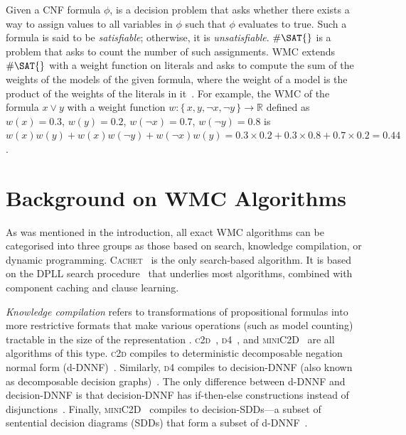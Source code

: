 \documentclass[letterpaper]{article} %
\theoremstyle{definition}
\theoremstyle{remark}
\begin{document}
Given a CNF formula $\phi$, \SAT{} is a decision problem that asks whether there
exists a way to assign values to all variables in $\phi$ such that $\phi$
evaluates to true. Such a formula is said to be \emph{satisfiable}; otherwise,
it is \emph{unsatisfiable}. $\#\SAT{}$ is a problem that asks to count the
number of such assignments. \textsf{WMC} extends $\#\SAT{}$ with a weight
function on literals and asks to compute the sum of the weights of the models of
the given formula, where the weight of a model is the product of the weights of
the literals in it~\cite{DBLP:journals/ai/ChaviraD08}. For example, the
\textsf{WMC} of the formula $x \lor y$ with a weight function $w\colon \{\,x, y,
\neg x, \neg y\,\} \to \mathbb{R}$ defined as $w(x) = 0.3$, $w(y) = 0.2$,
$w(\neg x) = 0.7$, $w(\neg y) = 0.8$ is $w(x)w(y)+w(x)w(\neg y)+w(\neg x)w(y) =
0.3 \times 0.2 + 0.3 \times 0.8 + 0.7 \times 0.2 = 0.44$.

\section{Background on \textsf{\textmd{WMC}} Algorithms}\label{sec:background}

As was mentioned in the introduction, all exact \textsf{WMC} algorithms can be
categorised into three groups as those based on search, knowledge compilation, or
dynamic programming. \textsc{Cachet}~\cite{DBLP:conf/sat/SangBBKP04} is the only
search-based algorithm. It is based on the DPLL search
procedure~\cite{DBLP:journals/jacm/DavisP60,DBLP:journals/cacm/DavisLL62} that
underlies most \SAT{} algorithms, combined with component caching and clause
learning.

\emph{Knowledge compilation} refers to transformations of propositional formulas
into more restrictive formats that make various operations (such as model
counting) tractable in the size of the representation
\cite{DBLP:journals/jair/DarwicheM02}.
\textsc{c2d}~\cite{DBLP:conf/ecai/Darwiche04},
\textsc{d4}~\cite{DBLP:conf/ijcai/LagniezM17}, and
\textsc{miniC2D}~\cite{DBLP:conf/ijcai/OztokD15}
are all algorithms of this type. \textsc{c2d} compiles to deterministic
decomposable negation normal form
(d-DNNF)~\cite{DBLP:journals/jancl/Darwiche01}. Similarly, \textsc{d4} compiles
to decision-DNNF (also known as decomposable decision
graphs)~\cite{DBLP:conf/aaai/FargierM06}. The only difference between d-DNNF and
decision-DNNF is that decision-DNNF has if-then-else constructions instead of
disjunctions~\cite{DBLP:conf/ijcai/LagniezM17}. Finally,
\textsc{miniC2D}~\cite{DBLP:conf/ijcai/OztokD15} compiles to decision-SDDs---a
subset of sentential decision diagrams (SDDs) that form a subset of
d-DNNF~\cite{DBLP:conf/ijcai/Darwiche11}.
\end{document}
